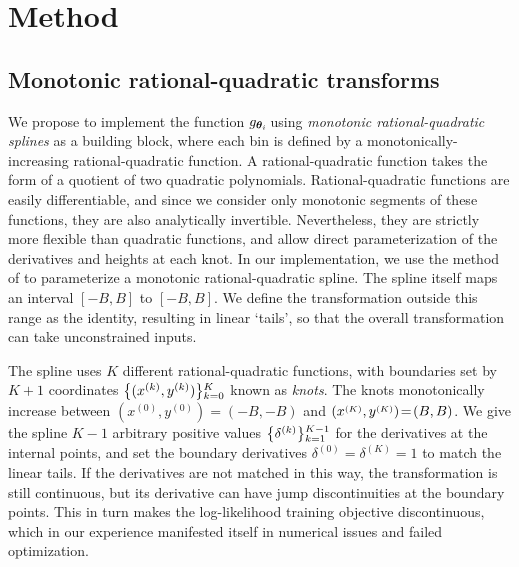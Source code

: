 \section{Method}

\subsection{Monotonic rational-quadratic transforms}
\label{sec:rq-splines}

We propose to implement the function $ g_{\bm{\theta}_{i}} \!$ using \emph{monotonic rational-quadratic splines} as a building block, where each bin is defined by a monotonically-increasing rational-quadratic function. 
A rational-quadratic function takes the form of a quotient of two quadratic polynomials.
Rational-quadratic functions are easily differentiable, and since we consider only monotonic segments of these functions, they are also analytically invertible. 
Nevertheless, they are strictly more flexible than quadratic functions, and allow direct parameterization of the derivatives and heights at each knot.
In our implementation, we use the method of \citet{gregory:1982:rationalquadratic} to parameterize a monotonic rational-quadratic spline. 
The spline itself maps an interval $ [-B, B] $ to $ [-B, B] $. We define the transformation outside this range as the identity, resulting in linear `tails', so that the overall transformation can take unconstrained inputs.

The spline uses $K$ different rational-quadratic functions, with boundaries set by \mbox{$K\!+\!1$} coordinates $\mathopen{}\left\lbrace(x^{(k)}, y^{(k)})\right\rbrace\mathclose{}_{k=0}^{K}$ known as \emph{knots}. The knots monotonically increase between $(x^{(0)}, y^{(0)}) \!=\! (-B, -B)$ and $(x\raisebox{-1pt}{\small ${}^{(K)}$}, y\raisebox{-1pt}{\small ${}^{(K)}$}) \!=\! (B, B)$. We give the spline $ K \!-\! 1 $ arbitrary positive values $ \mathopen{}\left\lbrace\delta^{(k)}\right\rbrace\mathclose{}_{k=1}^{K-1} $ for the derivatives at the internal points, and set the boundary derivatives $ \delta^{(0)} = \delta^{(K)} = 1 $ to match the linear tails. 
If the derivatives are not matched in this way, the transformation is still continuous, but its derivative can have jump discontinuities at the boundary points.
This in turn makes the log-likelihood training objective discontinuous, which in our experience manifested itself in numerical issues and failed optimization.

